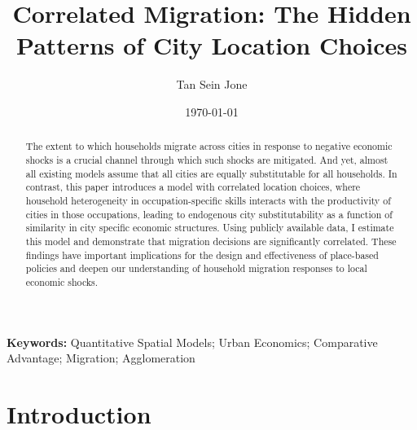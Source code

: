 \documentclass[10pt]{article}
\title{Correlated Migration: The Hidden Patterns of City Location Choices}
\author{Tan Sein Jone}
\date{\today}
\begin{document}
\doublespacing
\maketitle

\vfill


\begin{abstract}
    The extent to which households migrate across cities in response to negative economic shocks is a crucial channel through which such shocks are mitigated. And yet, almost all existing models assume that all cities are equally substitutable for all households. In contrast, this paper introduces a model with correlated location choices, where household heterogeneity in occupation-specific skills interacts with the productivity of cities in those occupations, leading to endogenous city substitutability as a function of similarity in city specific economic structures. Using publicly available data, I estimate this model and demonstrate that migration decisions are significantly correlated. These findings have important implications for the design and effectiveness of place-based policies and deepen our understanding of household migration responses to local economic shocks.
\end{abstract}

\vfill

\noindent\textbf{Keywords:} Quantitative Spatial Models; Urban Economics; Comparative Advantage; Migration; Agglomeration

\vfill

\newpage

\section{Introduction}
\end{document}
